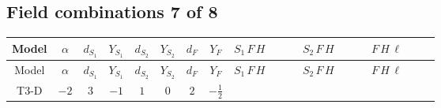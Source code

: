 \documentclass[8pt]{article}
\begin{document}
\begin{landscape}
\subsection*{Field combinations 7 of 8}
\begin{longtable}{@{}cccccccc >{\raggedright\arraybackslash}p{0.21\linewidth} >{\raggedright\arraybackslash}p{0.21\linewidth} >{\raggedright\arraybackslash}p{0.21\linewidth}@{}}
\toprule
Model & $\alpha$ & $d_{S_1}$ & $Y_{S_1}$ & $d_{S_2}$ & $Y_{S_2}$ & $d_F$ & $Y_F$ & $S_1\,F\,H$ & $S_2\,F\,H$ & $F\,H\,\ell$ \\
\midrule
\endfirsthead
\toprule
Model & $\alpha$ & $d_{S_1}$ & $Y_{S_1}$ & $d_{S_2}$ & $Y_{S_2}$ & $d_F$ & $Y_F$ & $S_1\,F\,H$ & $S_2\,F\,H$ & $F\,H\,\ell$ \\
\midrule
\endhead
T3-D & $-2$ & $3$ & $-1$ & $1$ & $0$ & $2$ & $-\frac{1}{2}$ & \scriptsize\adjustbox{max width=\linewidth}{$\begin{gathered} -\frac{2 \hbar  \log \left(\frac{\bar{\mu}^{2}}{M_F^2}\right) \overline{y_{1,i_1,r_1}} \overline{Y_{e,i_2,i_3}} H_{a_1} S_{1,j_1} y_{1,i_2,r_1} Y_{e,i_1,i_3} H_{a_1}{}^{\dagger } S_{1,j_1}{}^{\dagger }}{\sqrt{3}} \\ +2 i \sqrt{\frac{2}{3}} \hbar  \log \left(\frac{\bar{\mu}^{2}}{M_F^2}\right) \overline{y_{1,i_1,r_1}} \overline{Y_{e,i_2,i_3}} H_{a_2} S_{1,j_2} y_{1,i_2,r_1} Y_{e,i_1,i_3} H_{a_1}{}^{\dagger } S_{1,j_1}{}^{\dagger } \mathcal{I}_{H1,a_1,a_2,j_1,j_2}{}^1 \\ -\frac{2 \hbar  \log \left(\frac{\bar{\mu}^{2}}{M_F^2}\right) \overline{y_{1,i_1,r_1}} H_{a_2} S_{1,j_2} y_{1,i_1,r_1} H_{a_1}{}^{\dagger } S_{1,j_1}{}^{\dagger } \mathcal{I}_{H1,a_1,a_2,j_1,j_2}{}^2 \lambda_{HS_1}^{(1)}^{(2)}}{\sqrt{3}}\end{gathered}$} & \scriptsize\adjustbox{max width=\linewidth}{$\begin{gathered} -2 \hbar  \log \left(\frac{\bar{\mu}^{2}}{M_F^2}\right) \overline{y_{2,i_1,r_1}} \overline{Y_{e,i_2,i_3}} H_{a_1} S_2 y_{2,i_2,r_1} Y_{e,i_1,i_3} H_{a_1}{}^{\dagger } S_2{}^{\dagger } \\ -2 \hbar  \log \left(\frac{\bar{\mu}^{2}}{M_F^2}\right) \overline{y_{2,i_1,r_1}} H_{a_2} S_2 y_{2,i_1,r_1} H_{a_1}{}^{\dagger } S_2{}^{\dagger } \mathcal{I}_{H2,a_1,a_2}{}^1 \lambda_{HS_2}^{(1)}^{(1)}\end{gathered}$} & \scriptsize\adjustbox{max width=\linewidth}{$\begin{gathered} +\frac{2 \hbar  \log \left(\frac{\bar{\mu}^{2}}{M_F^2}\right) \overline{y_{1,i_1,r_1}} \overline{y_{2,i_2,r_1}} L_{a_4,i_2}{}^T\, C\, P_L\, L_{a_2,i_1} H_{a_1} H_{a_3} \lambda_5 \epsilon_{a_1,a_2} \epsilon_{a_3,a_4}}{\sqrt{3} M_F} \\ +\frac{2 \hbar  \log \left(\frac{\bar{\mu}^{2}}{M_F^2}\right) \overline{\lambda_5} \overline{L_{a_3,i_1}}\, C\, P_R\, \overline{L_{a_4,i_2}}{}^T y_{1,i_1,r_1} y_{2,i_2,r_1} \epsilon_{a_1,a_3} \epsilon_{a_2,a_4} H_{a_1}{}^{\dagger } H_{a_2}{}^{\dagger }}{\sqrt{3} M_F}\end{gathered}$} \\
\midrule
\bottomrule
\end{longtable}
\clearpage

\end{landscape}
\end{document}
